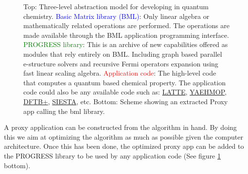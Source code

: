 \begin{figure}[htpb]
  \caption{Top: Three-level abstraction model for developing in quantum chemistry. \textcolor{blue}{Basic Matrix library (BML)}: Only linear algebra or mathematically related operations are performed. The operations are made available through the BML application programming interface.  
  \textcolor{green}{PROGRESS library}: This is an archive of new capabilities offered as modules that rely entirely on BML. Including graph based parallel e-structure solvers and recursive Fermi operators expansion using fast linear scaling algebra.  
  \textcolor{red}{Application code}: The high-level code that computes a quantum based chemical property. The application code could also be any available code such as: \href{https://github.com/lanl/LATTE}{LATTE}, \href{http://yaehmop.sourceforge.net/}{YAEHMOP}, \href{http://www.dftb-plus.info/}{DFTB+}, \href{http://departments.icmab.es/leem/siesta/}{SIESTA}, etc.
  Bottom: Scheme showing an extracted Proxy app calling the bml library.
  }
  \label{scheme}
 \end{figure}
  
 A proxy application can be constructed from the algorithm in hand. By doing this we aim at optimizing the algorithm as much as possible given the computer architecture. Once this has been done, the optimized proxy app can be added to the PROGRESS library to be used by any application code (See figure \ref{scheme} bottom). 
